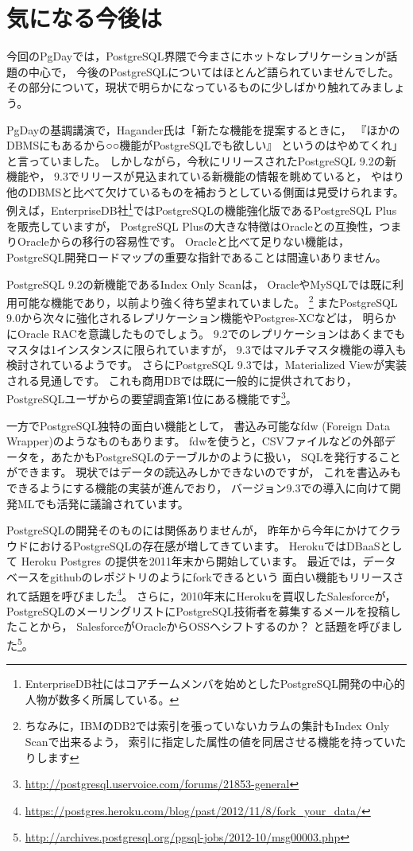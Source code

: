 \section{気になる今後は}

今回のPgDayでは，PostgreSQL界隈で今まさにホットなレプリケーションが話題の中心で，
今後のPostgreSQLについてはほとんど語られていませんでした。
その部分について，現状で明らかになっているものに少しばかり触れてみましょう。

PgDayの基調講演で，Hagander氏は「新たな機能を提案するときに，
『ほかのDBMSにもあるから○○機能がPostgreSQLでも欲しい』
というのはやめてくれ」と言っていました。
しかしながら，今秋にリリースされたPostgreSQL 9.2の新機能や，
9.3でリリースが見込まれている新機能の情報を眺めていると，
やはり他のDBMSと比べて欠けているものを補おうとしている側面は見受けられます。
例えば，EnterpriseDB社\footnote{EnterpriseDB社にはコアチームメンバを始めとしたPostgreSQL開発の中心的人物が数多く所属している。}ではPostgreSQLの機能強化版であるPostgreSQL Plusを販売していますが，
PostgreSQL Plusの大きな特徴はOracleとの互換性，つまりOracleからの移行の容易性です。
Oracleと比べて足りない機能は，PostgreSQL開発ロードマップの重要な指針であることは間違いありません。

PostgreSQL 9.2の新機能であるIndex Only Scanは，
OracleやMySQLでは既に利用可能な機能であり，以前より強く待ち望まれていました。
\footnote{ちなみに，IBMのDB2では索引を張っていないカラムの集計もIndex Only Scanで出来るよう，
索引に指定した属性の値を同居させる機能を持っていたりします}
またPostgreSQL 9.0から次々に強化されるレプリケーション機能やPostgres-XCなどは，
明らかにOracle RACを意識したものでしょう。
9.2でのレプリケーションはあくまでもマスタは1インスタンスに限られていますが，
9.3ではマルチマスタ機能の導入も検討されているようです。
さらにPostgreSQL 9.3では，Materialized Viewが実装される見通しです。
これも商用DBでは既に一般的に提供されており，
PostgreSQLユーザからの要望調査第1位にある機能です\footnote{\url{http://postgresql.uservoice.com/forums/21853-general}}。

一方でPostgreSQL独特の面白い機能として，
書込み可能なfdw (Foreign Data Wrapper)のようなものもあります。
fdwを使うと，CSVファイルなどの外部データを，あたかもPostgreSQLのテーブルかのように扱い，
SQLを発行することができます。
現状ではデータの読込みしかできないのですが，
これを書込みもできるようにする機能の実装が進んでおり，
バージョン9.3での導入に向けて開発MLでも活発に議論されています。

PostgreSQLの開発そのものには関係ありませんが，
昨年から今年にかけてクラウドにおけるPostgreSQLの存在感が増してきています。
HerokuではDBaaSとして Heroku Postgres の提供を2011年末から開始しています。
最近では，データベースをgithubのレポジトリのようにforkできるという
面白い機能もリリースされて話題を呼びました\footnote{\url{https://postgres.heroku.com/blog/past/2012/11/8/fork_your_data/}}。
さらに，2010年末にHerokuを買収したSalesforceが，
PostgreSQLのメーリングリストにPostgreSQL技術者を募集するメールを投稿したことから，
SalesforceがOracleからOSSへシフトするのか？
と話題を呼びました\footnote{\url{http://archives.postgresql.org/pgsql-jobs/2012-10/msg00003.php}}。


